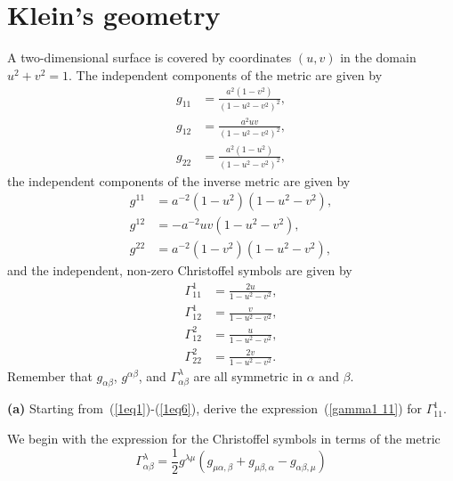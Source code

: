 \documentclass[a4paper]{article} %
\begin{document}
\section{Klein's geometry}
\begin{framed}
A two-dimensional surface is covered by coordinates $(u,v)$ in the domain $u^2+v^2=1$. The independent components of the metric are given by
\begin{align}
g_{11}&=\frac{a^2(1-v^2)}{(1-u^2-v^2)^2},\label{1eq1}\\
g_{12}&=\frac{a^2 uv}{(1-u^2-v^2)^2},\\
g_{22}&=\frac{a^2(1-u^2)}{(1-u^2-v^2)^2},\label{1eq3}
\end{align}
the independent components of the inverse metric are given by
\begin{align}
g^{11}&=a^{-2}(1-u^2)(1-u^2-v^2),\\
g^{12}&=-a^{-2} uv (1-u^2-v^2),\\
g^{22}&= a^{-2}(1-v^2)(1-u^2-v^2),\label{1eq6}
\end{align}
and the independent, non-zero Christoffel symbols are given by
\begin{align}
\Gamma^{1}_{11}&=\frac{2u}{1-u^2-v^2},\label{gamma1 11}\\
\Gamma^{1}_{12}&=\frac{v}{1-u^2-v^2},\\
\Gamma^{2}_{12}&=\frac{u}{1-u^2-v^2},\\
\Gamma^{2}_{22}&=\frac{2v}{1-u^2-v^2}.
\end{align}
Remember that $g_{\alpha\beta}$, $g^{\alpha\beta}$, and $\Gamma^{\lambda}_{\alpha\beta}$ are all symmetric in $\alpha$ and $\beta$.
\end{framed}

\begin{framed}
\textbf{(a)} Starting from~(\ref{1eq1})-(\ref{1eq6}), derive the expression~(\ref{gamma1 11}) for $\Gamma^{1}_{11}$.
\end{framed}

We begin with the expression for the Christoffel symbols in terms of the metric
\begin{equation}
\Gamma^{\lambda}_{\alpha \beta}=\frac{1}{2}g^{\lambda\mu}\left(g_{\mu\alpha,\beta}+g_{\mu\beta,\alpha}
-g_{\alpha\beta,\mu}\right)
\end{equation}
\end{document}
